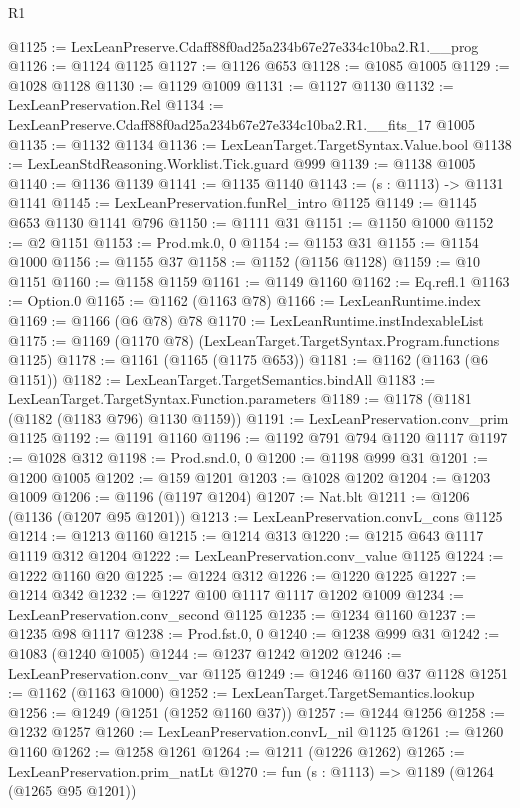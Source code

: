 \begin{lexlean}{R1}
\begin{coremodule}
@1125 := LexLeanPreserve.Cdaff88f0ad25a234b67e27e334c10ba2.R1.__prog
@1126 := @1124 @1125
@1127 := @1126 @653
@1128 := @1085 @1005
@1129 := @1028 @1128
@1130 := @1129 @1009
@1131 := @1127 @1130
@1132 := LexLeanPreservation.Rel
@1134 := LexLeanPreserve.Cdaff88f0ad25a234b67e27e334c10ba2.R1.__fits_17 @1005
@1135 := @1132 @1134
@1136 := LexLeanTarget.TargetSyntax.Value.bool
@1138 := LexLeanStdReasoning.Worklist.Tick.guard @999
@1139 := @1138 @1005
@1140 := @1136 @1139
@1141 := @1135 @1140
@1143 := (s : @1113) -> @1131 @1141
@1145 := LexLeanPreservation.funRel_intro @1125
@1149 := @1145 @653 @1130 @1141 @796
@1150 := @1111 @31
@1151 := @1150 @1000
@1152 := @2 @1151
@1153 := Prod.mk.{0, 0}
@1154 := @1153 @31
@1155 := @1154 @1000
@1156 := @1155 @37
@1158 := @1152 (@1156 @1128)
@1159 := @10 @1151
@1160 := @1158 @1159
@1161 := @1149 @1160
@1162 := Eq.refl.{1}
@1163 := Option.{0}
@1165 := @1162 (@1163 @78)
@1166 := LexLeanRuntime.index
@1169 := @1166 (@6 @78) @78
@1170 := LexLeanRuntime.instIndexableList
@1175 := @1169 (@1170 @78) (LexLeanTarget.TargetSyntax.Program.functions @1125)
@1178 := @1161 (@1165 (@1175 @653))
@1181 := @1162 (@1163 (@6 @1151))
@1182 := LexLeanTarget.TargetSemantics.bindAll
@1183 := LexLeanTarget.TargetSyntax.Function.parameters
@1189 := @1178 (@1181 (@1182 (@1183 @796) @1130 @1159))
@1191 := LexLeanPreservation.conv_prim @1125
@1192 := @1191 @1160
@1196 := @1192 @791 @794 @1120 @1117
@1197 := @1028 @312
@1198 := Prod.snd.{0, 0}
@1200 := @1198 @999 @31
@1201 := @1200 @1005
@1202 := @159 @1201
@1203 := @1028 @1202
@1204 := @1203 @1009
@1206 := @1196 (@1197 @1204)
@1207 := Nat.blt
@1211 := @1206 (@1136 (@1207 @95 @1201))
@1213 := LexLeanPreservation.convL_cons @1125
@1214 := @1213 @1160
@1215 := @1214 @313
@1220 := @1215 @643 @1117 @1119 @312 @1204
@1222 := LexLeanPreservation.conv_value @1125
@1224 := @1222 @1160 @20
@1225 := @1224 @312
@1226 := @1220 @1225
@1227 := @1214 @342
@1232 := @1227 @100 @1117 @1117 @1202 @1009
@1234 := LexLeanPreservation.conv_second @1125
@1235 := @1234 @1160
@1237 := @1235 @98 @1117
@1238 := Prod.fst.{0, 0}
@1240 := @1238 @999 @31
@1242 := @1083 (@1240 @1005)
@1244 := @1237 @1242 @1202
@1246 := LexLeanPreservation.conv_var @1125
@1249 := @1246 @1160 @37 @1128
@1251 := @1162 (@1163 @1000)
@1252 := LexLeanTarget.TargetSemantics.lookup
@1256 := @1249 (@1251 (@1252 @1160 @37))
@1257 := @1244 @1256
@1258 := @1232 @1257
@1260 := LexLeanPreservation.convL_nil @1125
@1261 := @1260 @1160
@1262 := @1258 @1261
@1264 := @1211 (@1226 @1262)
@1265 := LexLeanPreservation.prim_natLt
@1270 := fun (s : @1113) => @1189 (@1264 (@1265 @95 @1201))

\end{coremodule}
\end{lexlean}
